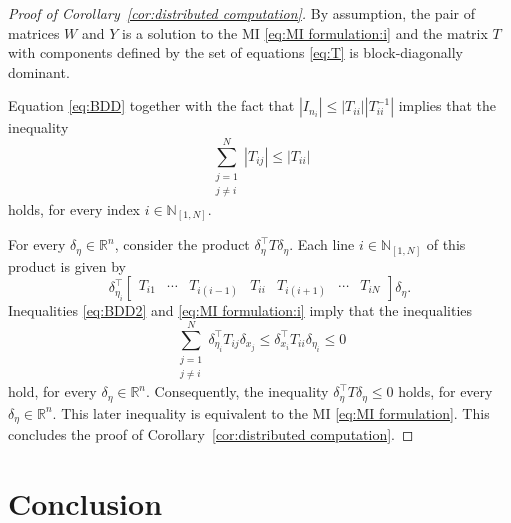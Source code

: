 \documentclass[10pt,twocolumn,twoside]{IEEEtran}
\theoremstyle{plain}
\theoremstyle{definition}
\theoremstyle{remark}
\begin{document}
\begin{proof}[Proof of Corollary~\ref{cor:distributed computation}]
	By assumption, the pair of matrices $W$ and $Y$ is a solution to the MI \eqref{eq:MI formulation:i} and the matrix $T$ with components defined by the set of equations \eqref{eq:T} is block-diagonally dominant.
	
	Equation \eqref{eq:BDD} together with the fact that $|I_{n_i}|\leq |T_{ii}||T_{ii}^{-1}|$ implies that the inequality
	\begin{equation}\label{eq:BDD2} 
		\sum_{\substack{j=1\\ j\neq i}}^N|T_{ij}|\leq |T_{ii}|
	\end{equation}
	holds, for every index $i\in\mathbb{N}_{[1,N]}$.
	
	For every $\delta_\eta\in\mathbb{R}^n$, consider the product $\delta_\eta^\top T\delta_\eta$. Each line $i\in\mathbb{N}_{[1,N]}$ of this product is given by
	\begin{equation*}
		\delta_{\eta_i}^\top\begin{bmatrix}
			T_{i1}&\cdots&T_{i(i-1)}&T_{ii}&T_{i(i+1)}&\cdots&T_{iN}
		\end{bmatrix}\delta_\eta.
	\end{equation*}
	Inequalities \eqref{eq:BDD2} and \eqref{eq:MI formulation:i} imply that the inequalities
	\begin{equation*}
		\sum_{\substack{j=1\\ j\neq i}}^N\delta_{\eta_i}^\top T_{ij}\delta_{x_j}\leq \delta_{x_i}^\top T_{ii}\delta_{\eta_i}\leq 0
	\end{equation*}
	hold, for every $\delta_\eta\in\mathbb{R}^n$. Consequently, the inequality $\delta_\eta^\top T\delta_\eta\leq 0$ holds, for every $\delta_\eta\in\mathbb{R}^n$. This later inequality is equivalent to the MI \eqref{eq:MI formulation}. This concludes the proof of Corollary~\ref{cor:distributed computation}.
\end{proof}


\section{Conclusion}\label{sec:Conclusion}

\appendices


\ifCLASSOPTIONcaptionsoff
  \newpage
\fi



\end{document}
